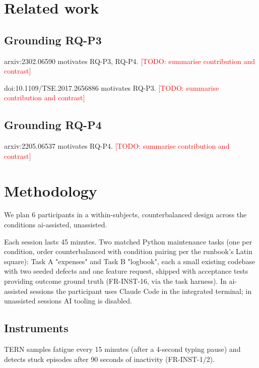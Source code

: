 \documentclass[11pt]{article}
\newcommand{\todo}[1]{\textcolor{red}{[TODO: #1]}}
\begin{document}
\section{Related work}

\subsection{Grounding RQ-P3}

arxiv:2302.06590 motivates RQ-P3, RQ-P4. \citep{arxiv_2302_06590} \todo{summarise contribution and contrast}

doi:10.1109/TSE.2017.2656886 motivates RQ-P3. \citep{doi_10_1109_tse_2017_2656886} \todo{summarise contribution and contrast}

\subsection{Grounding RQ-P4}

arxiv:2205.06537 motivates RQ-P4. \citep{arxiv_2205_06537} \todo{summarise contribution and contrast}

\section{Methodology}

We plan 6 participants in a within-subjects, counterbalanced design across the conditions ai-assisted, unassisted.

Each session lasts 45 minutes. Two matched Python maintenance tasks (one per condition, order counterbalanced with condition pairing per the runbook's Latin square): Task A "expenses" and Task B "logbook", each a small existing codebase with two seeded defects and one feature request, shipped with acceptance tests providing outcome ground truth (FR-INST-16, via the task harness). In ai-assisted sessions the participant uses Claude Code in the integrated terminal; in unassisted sessions AI tooling is disabled.

\subsection{Instruments}

TERN samples fatigue every 15 minutes (after a 4-second typing pause) and detects stuck episodes after 90 seconds of inactivity (FR-INST-1/2).
\end{document}
